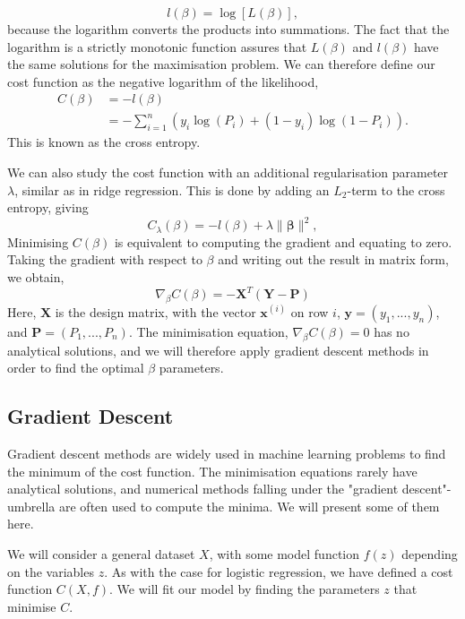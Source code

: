 \documentclass[a4paper, 
amsfonts, 
amssymb, 
amsmath, 
reprint, 
showkeys, 
nofootinbib, 
twoside]{revtex4-2}
\begin{document}
\begin{equation}
    l(\beta) = \log [L(\beta)],
\end{equation}
because the logarithm converts the products into summations. The fact that the logarithm is a strictly monotonic function assures that $L(\beta)$ and $l(\beta)$ have the same solutions for the maximisation problem. We can therefore define our cost function as the negative logarithm of the likelihood,
\begin{equation}
\begin{split}
    C(\beta) &= -l(\beta) \\
    &= -\sum_{i = 1}^n (y_i \log (P_i) + (1 - y_i)\log(1 - P_i)).  
\end{split}
\label{eq:cost}
\end{equation}
This is known as the cross entropy. 

We can also study the cost function with an additional regularisation parameter $\lambda$, similar as in ridge regression. This is done by adding an $L_2$-term to the cross entropy, giving
\begin{equation}
    C_{\lambda}(\beta) = -l(\beta) + \lambda \lVert \bm{\beta}\rVert^2,
    \label{eq:ridge}
\end{equation}
Minimising $C(\beta)$ is equivalent to computing the gradient and equating to zero.  Taking the gradient with respect to $\beta$ and writing out the result in matrix form, we obtain,
\begin{equation}
    \nabla_{\beta}C(\beta) = - \bm{X}^T(\bm{Y} - \bm{P}) 
\end{equation}
Here, $\bm{X}$ is the design matrix, with the vector $\bm{x}^{(i)}$ on row $i$, $\bm{y} = (y_1, ..., y_n)$, and $\bm{P} = (P_1, ..., P_n)$.
The minimisation equation, $\nabla_{\beta}C(\beta) = 0$ has no analytical solutions, and we will therefore apply gradient descent methods in order to find the optimal $\beta$ parameters.

\subsection{Gradient Descent}
Gradient descent methods are widely used in machine learning problems to find the minimum of the cost function. The minimisation equations rarely have analytical solutions, and numerical methods falling under the "gradient descent"-umbrella are often used to compute the minima. We will present some of them here. 

We will consider a general dataset $X$, with some model function $f(z)$ depending on the variables $z$. As with the case for logistic regression, we have defined a cost function $C(X, f)$. We will fit our model by finding the parameters $z$ that minimise $C$. 
\end{document}
